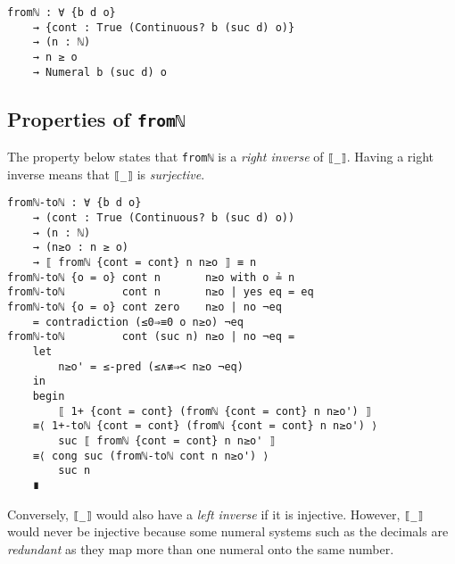\documentclass[\main/thesis.tex]{subfiles}
\begin{document}
\begin{lstlisting}
fromℕ : ∀ {b d o}
    → {cont : True (Continuous? b (suc d) o)}
    → (n : ℕ)
    → n ≥ o
    → Numeral b (suc d) o
\end{lstlisting}

\subsection{Properties of \lstinline|fromℕ|}

The property below states that \lstinline|fromℕ| is a \textit{right inverse} of
\lstinline|⟦_⟧|. Having a right inverse means that \lstinline|⟦_⟧| is
\textit{surjective}.

\begin{lstlisting}
fromℕ-toℕ : ∀ {b d o}
    → (cont : True (Continuous? b (suc d) o))
    → (n : ℕ)
    → (n≥o : n ≥ o)
    → ⟦ fromℕ {cont = cont} n n≥o ⟧ ≡ n
fromℕ-toℕ {o = o} cont n       n≥o with o ≟ n
fromℕ-toℕ         cont n       n≥o | yes eq = eq
fromℕ-toℕ {o = o} cont zero    n≥o | no ¬eq
    = contradiction (≤0⇒≡0 o n≥o) ¬eq
fromℕ-toℕ         cont (suc n) n≥o | no ¬eq =
    let
        n≥o' = ≤-pred (≤∧≢⇒< n≥o ¬eq)
    in
    begin
        ⟦ 1+ {cont = cont} (fromℕ {cont = cont} n n≥o') ⟧
    ≡⟨ 1+-toℕ {cont = cont} (fromℕ {cont = cont} n n≥o') ⟩
        suc ⟦ fromℕ {cont = cont} n n≥o' ⟧
    ≡⟨ cong suc (fromℕ-toℕ cont n n≥o') ⟩
        suc n
    ∎
\end{lstlisting}

Conversely, \lstinline|⟦_⟧| would also have a \textit{left inverse} if it is
injective.
However, \lstinline|⟦_⟧| would never be injective because some numeral systems
such as the decimals are \textit{redundant} as they map more than one numeral
onto the same number.
\end{document}
